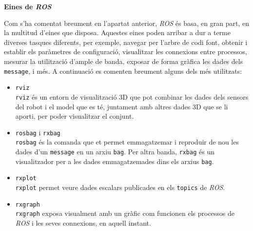 \documentclass[12pt,a4paper,final,twoside]{article}
\begin{document}
\vspace{20pt}
\textbf{Eines de \textit{ROS}}

Com s'ha comentat breument en l'apartat anterior, \textit{ROS} és basa, en gran part, en la multitud d'eines que disposa. Aquestes eines poden arribar a dur a terme diverses tasques diferents, per exemple, navegar per l'arbre de codi font, obtenir i establir els paràmetres de configuració, visualitzar les connexions entre processos, mesurar la utilització d'ample de banda, exposar de forma gràfica les dades dels \texttt{message}, i més. A continuació es comenten breument alguns dels més utilitzats:
\begin{itemize}
\item \texttt{rviz}\\
\texttt{rviz} és un entorn de visualització 3D que pot combinar les dades dels sensors del robot i el model que es té, juntament amb altres dades 3D que se li aporti, per poder visualitzar el conjunt.

\item \texttt{rosbag} i \texttt{rxbag}\\
\texttt{rosbag} és la comanda que et permet emmagatzemar i reproduir de nou les dades d'un \texttt{message} en un arxiu \texttt{bag}. Per altra banda, \texttt{rxbag} és un visualitzador per a les dades emmagatzemades dins els arxius \texttt{bag}.

\item \texttt{rxplot}\\
\texttt{rxplot} permet veure dades escalars publicades en els \texttt{topics} de \textit{ROS}.

\item \texttt{rxgraph}\\
\texttt{rxgraph} exposa visualment amb un gràfic com funcionen els processos de \textit{ROS} i les seves connexions, en aquell instant.

\end{itemize}

\end{document}
